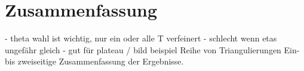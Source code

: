 \chapter*{Zusammenfassung}

- theta wahl ist wichtig, nur ein oder alle T verfeinert
- schlecht wenn etas ungefähr gleich
- gut für plateau / bild beispiel
Reihe von Triangulierungen 
Ein- bis zweiseitige Zusammenfassung der Ergebnisse.
